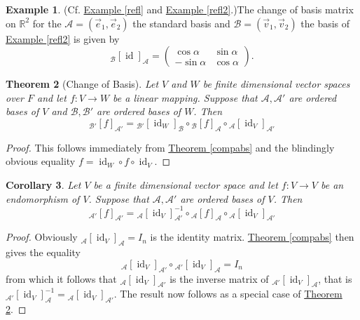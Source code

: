 \documentclass[11pt]{amsbook}
\DeclareMathOperator{\id}{\mathrm{id}}
\newtheorem{theorem}{Theorem}[section]
\newtheorem{corollary}[theorem]{Corollary}
\theoremstyle{definition}
\newtheorem{ex}[theorem]{Example}
\begin{document}
\begin{ex} (Cf. \hyperref[refl]{Example \ref{refl}} and \hyperref[refl2]{Example \ref{refl2}}.)\label{refl3}
The change of basis matrix on $\mathbb{R}^2$ for the $\mathcal{A} = (\vec{e}_1, \vec{e}_2)$ the standard basis and $\mathcal{B} = (\vec{v}_1 , \vec{v}_2)$ the basis of \hyperref[refl2]{Example \ref{refl2}} is given by $${}_\mathcal{B}[\id]_{\mathcal{A}} = \begin{pmatrix} \cos \alpha &  \sin \alpha \\ - \sin \alpha & \cos \alpha \end{pmatrix}.$$
\end{ex}

\begin{theorem}[Change of Basis] \label{changeofbasis}
Let $V$ and $W$ be finite dimensional vector spaces over $F$ and let $f:V \to W$ be a linear mapping. Suppose that $\mathcal{A}, \mathcal{A'}$ are ordered bases of $V$ and $\mathcal{B}, \mathcal{B'}$ are ordered bases of $W$. Then $${}_\mathcal{B'}[f]_{\mathcal{A'}} = {}_\mathcal{B'}[\id_W]_{\mathcal{B}}\circ {}_\mathcal{B} [f]_{\mathcal{A}} \circ {}_{\mathcal{A}} [\id_V]_{\mathcal{A'}}$$
\end{theorem}
\begin{proof} This follows immediately from \hyperref[compabs]{Theorem \ref{compabs}} and the blindingly obvious equality $f  = \id_W \circ f \circ \id_V$.
\end{proof}

\begin{corollary} \label{cobcor}
Let $V$ be a finite dimensional vector space and let $f:V\to V$ be an endomorphism of $V$. Suppose that $\mathcal{A}, \mathcal{A'}$ are ordered bases of $V$. Then $${}_\mathcal{A'}[f]_{\mathcal{A'}} = {}_\mathcal{A}[\id_V]^{-1}_{\mathcal{A'}}\circ {}_\mathcal{A} [f]_{\mathcal{A}} \circ {}_{\mathcal{A}} [\id_V]_{\mathcal{A'}}$$
\end{corollary}

\begin{proof}
Obviously ${}_{\mathcal{A}}[\id_V]_{\mathcal{A}} = I_n$ is the identity matrix.   \hyperref[compabs]{Theorem \ref{compabs}} then gives the equality $$ {}_{\mathcal{A}} [\id_V]_{\mathcal{A'}} \circ {}_{\mathcal{A'}} [\id_V]_{\mathcal{A}} = I_n$$ from which it follows that ${}_{\mathcal{A}} [\id_V]_{\mathcal{A'}}$ is the inverse matrix of ${}_{\mathcal{A'}} [\id_V]_{\mathcal{A}}$, that is ${}_{\mathcal{A'}} [\id_V]_{\mathcal{A}}^{-1} = {}_{\mathcal{A}} [\id_V]_{\mathcal{A'}}$. The result now follows as a special case of \hyperref[changeofbasis]{Theorem \ref{changeofbasis}}.
\end{proof}
\end{document}
